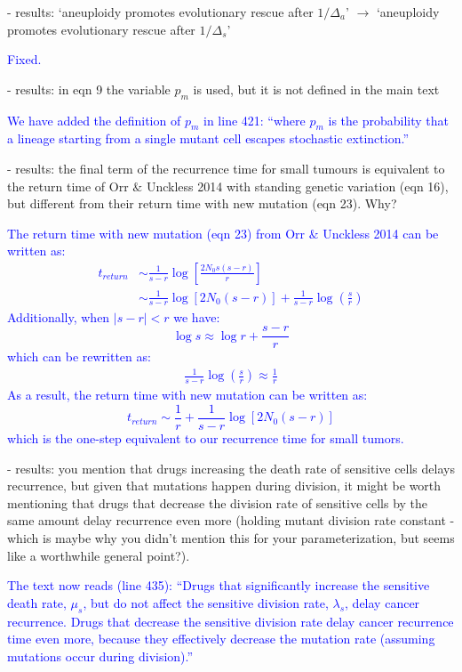 \documentclass[12pt]{extarticle}
\begin{document}
- results: `aneuploidy promotes evolutionary rescue after $1/\Delta_a$' $\rightarrow$ `aneuploidy promotes evolutionary rescue after $1/\Delta_s$'

\textcolor{blue}{Fixed.} %

- results: in eqn 9 the variable $p_m$ is used, but it is not defined in the main text

\textcolor{blue}{%
We have added the definition of $p_m$ in line 421: ``where $p_m$ is the probability that a lineage starting from a single mutant cell escapes stochastic extinction.''
} 

- results: the final term of the recurrence time for small tumours is equivalent to the return time of Orr $\&$ Unckless 2014 with standing genetic variation (eqn 16), but different from their return time with new mutation (eqn 23). Why?

\textcolor{blue}{
The return time with new mutation (eqn 23) from Orr $\&$ Unckless 2014 can be written as:
\begin{align*}
t_{return}&\sim\frac{1}{s-r}\log\left[\frac{2N_0s(s-r)}{r}\right]\\
&\sim \frac{1}{s-r}\log[2N_0(s-r)]+\frac{1}{s-r}\log\left(\frac{s}{r}\right)
\end{align*}
Additionally, when $|s-r|<r$ we have:
\begin{equation*}
\log s \approx \log r +\frac{s-r}{r}
\end{equation*}
which can be rewritten as:
\begin{align*}
\frac{1}{s-r}\log\left(\frac{s}{r}\right)\approx \frac{1}{r}
\end{align*}
As a result, the return time with new mutation can be written as:
\begin{equation*}
t_{return}\sim \frac{1}{r}+\frac{1}{s-r}\log[2N_0(s-r)]
\end{equation*}
which is the one-step equivalent to our recurrence time for small tumors.
} 

- results: you mention that drugs increasing the death rate of sensitive cells delays recurrence, but given that mutations happen during division, it might be worth mentioning that drugs that decrease the division rate of sensitive cells by the same amount delay recurrence even more (holding mutant division rate constant - which is maybe why you didn't mention this for your parameterization, but seems like a worthwhile general point?).

\textcolor{blue}{%
The text now reads (line 435): ``Drugs that significantly increase the sensitive death rate, $\mu_s$, but do not affect the sensitive division rate, $\lambda_s$, delay cancer recurrence. Drugs that decrease the sensitive division rate delay cancer recurrence time even more, because they effectively decrease the mutation rate (assuming mutations occur during division).''
}
\end{document}
